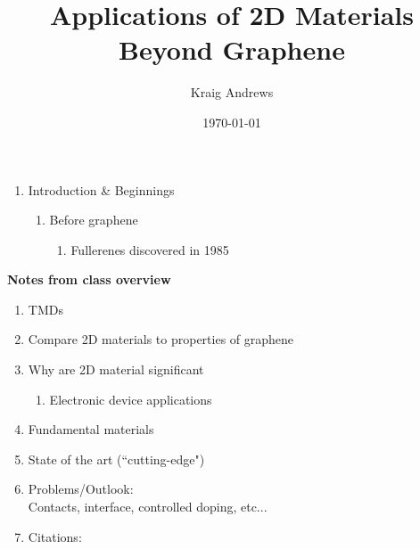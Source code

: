 \documentclass{article}
\author{Kraig Andrews}
\title{Applications of 2D Materials Beyond Graphene}
\date{\today}
\begin{document}
\maketitle

\begin{enumerate}%
	\item{ Introduction \& Beginnings
}
	\begin{enumerate} %
		\item{Before graphene}
			\begin{enumerate} %
				\item{Fullerenes discovered in 1985 \cite{KrotoFullerenes1985}}
			\end{enumerate}	%
	\end{enumerate} %

\end{enumerate} %

\textbf{Notes from class overview}
\begin{enumerate} %
	\item{TMDs}

	\item{Compare 2D materials to properties of graphene}

	\item{Why are 2D material significant}
	\begin{enumerate} %
		\item{Electronic device applications}
	\end{enumerate} %

	\item{Fundamental materials}

	\item{State of the art (``cutting-edge")}

	\item{Problems/Outlook:\\
		Contacts, interface, controlled doping, etc...}

	\item{Citations: \cite{2DflexibleNanoElectronics2014, nanoscaleReview2011,acsnanoReview2013, singleLayerMoS2electronics2015, vanderWaalsHeterostruct2013, electronicsAndOptoelectronics2012, NovoselovEtAl2005}}

\end{enumerate} %



\end{document}
